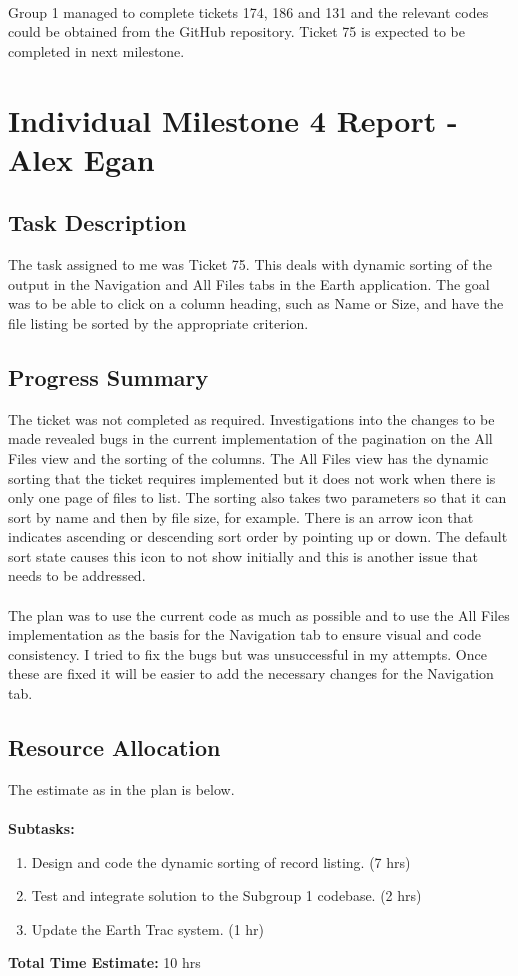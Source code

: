 \documentclass[10pt,a4,oneside]{article}
\begin{document}
\paragraph{}
\noindent Group 1 managed to complete tickets 174, 186 and 131 and the relevant codes could be obtained from the GitHub repository. Ticket 75 is expected to be completed in next milestone.

\newpage

\section{Individual Milestone 4 Report - Alex Egan}

\subsection*{Task Description}
The task assigned to me was Ticket 75. This deals with dynamic sorting of the output in the Navigation and All Files tabs in the Earth application. The goal was to be able to click on a column heading, such as Name or Size, and have the file listing be sorted by the appropriate criterion.

\subsection*{Progress Summary}
\label{prog-sum}
The ticket was not completed as required. Investigations into the changes to be made revealed bugs in the current implementation of the pagination on the All Files view and the sorting of the columns. The All Files view has the dynamic sorting that the ticket requires implemented but it does not work when there is only one page of files to list. The sorting also takes two parameters so that it can sort by name and then by file size, for example. There is an arrow icon that indicates ascending or descending sort order by pointing up or down. The default sort state causes this icon to not show initially and this is another issue that needs to be addressed.\\
\\
The plan was to use the current code as much as possible and to use the All Files implementation as the basis for the Navigation tab to ensure visual and code consistency. I tried to fix the bugs but was unsuccessful in my attempts. Once these are fixed it will be easier to add the necessary changes for the Navigation tab.

\subsection*{Resource Allocation}
The estimate as in the plan is below.\\
\\
\textbf{Subtasks:}
\begin{enumerate}
	\item Design and code the dynamic sorting of record listing. (7 hrs)
	\item Test and integrate solution to the Subgroup 1 codebase. (2 hrs)
	\item Update the Earth Trac system. (1 hr)
\end{enumerate}
\textbf{Total Time Estimate:} 10 hrs
\end{document}

